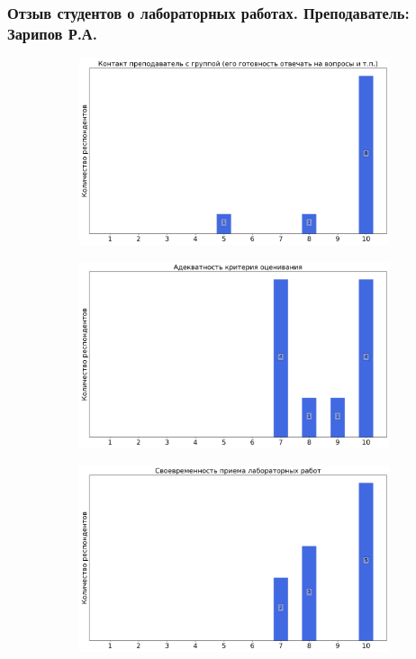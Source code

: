     \subsubsection{Отзыв студентов о лабораторных работах. Преподаватель: Зарипов Р.А.}
		\begin{figure}[H]
			\centering
			\begin{subfigure}[b]{0.45\textwidth}
				\centering
				\includegraphics[width=\textwidth]{images/3 course/Аналоговая электроника/labniks-marks-Зарипов Р.А.-0.png}
			\end{subfigure}
			\begin{subfigure}[b]{0.45\textwidth}
				\centering
				\includegraphics[width=\textwidth]{images/3 course/Аналоговая электроника/labniks-marks-Зарипов Р.А.-1.png}
			\end{subfigure}
			\begin{subfigure}[b]{0.45\textwidth}
				\centering
				\includegraphics[width=\textwidth]{images/3 course/Аналоговая электроника/labniks-marks-Зарипов Р.А.-2.png}

\end{subfigure}
\end{figure}
